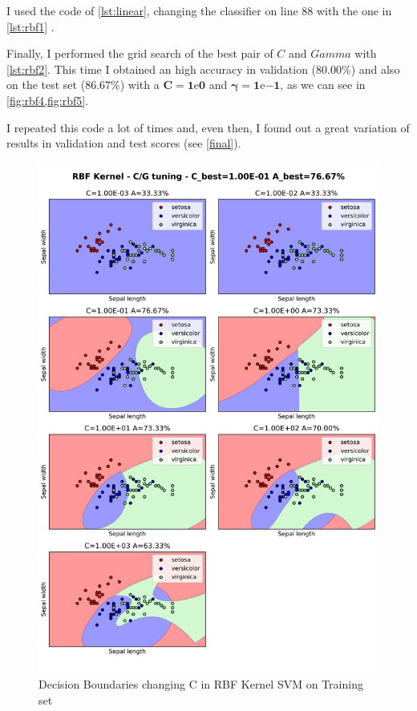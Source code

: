 \documentclass[a4paper, 11pt]{article}
\begin{document}
	I used the code of \vref{lst:linear}, changing the classifier on line $88$ with the one in \vref{lst:rbf1} .
	
	
	
	Finally, I performed the grid search of the best pair of $C$ and $Gamma$ with \vref{lst:rbf2}. This time I obtained an high accuracy in validation ($\boldsymbol{80.00\%}$) and also on the test set ($\boldsymbol{86.67\%}$) with a $\boldsymbol{C=1\mathrm{e}{0}}$ and $\boldsymbol{\gamma=1\mathrm{e}{-1}}$, as we can see in \vref{fig:rbf4,fig:rbf5}.
	
	
	
	I repeated this code a lot of times and, even then, I found out a great variation of results in validation and test scores (see \vref{final}).
	
	\begin{figure}[ht!]
		\centering
		\includegraphics[height=0.8\paperheight]{img/fig02a.png}
		\caption{Decision Boundaries changing C in RBF Kernel SVM on Training set}
		\label{fig:rbf1}
	\end{figure}
	
\end{document}
